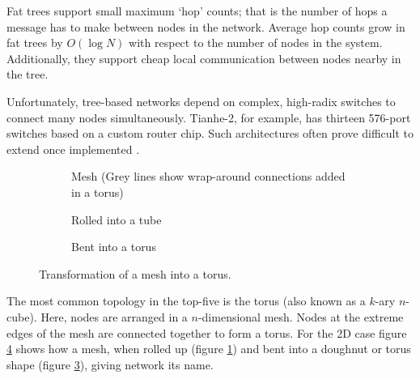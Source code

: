 				Fat trees support small maximum `hop' counts; that is the number of hops
				a message has to make between nodes in the network. Average hop counts
				grow in fat trees by $O(\log{N})$ with respect to the number of nodes in
				the system. Additionally, they support cheap local communication between
				nodes nearby in the tree.
				
				Unfortunately, tree-based networks depend on complex, high-radix
				switches to connect many nodes simultaneously.  Tianhe-2, for example,
				has thirteen 576-port switches based on a custom router chip. Such
				architectures often prove difficult to extend once implemented
				\cite{dally04}.
				
				\begin{figure}
					\begin{subfigure}[t]{\textwidth}
						\center
						
						\caption{Mesh (Grey lines show wrap-around connections added in a
						torus)}
						\label{fig:torus-flat}
					\end{subfigure}
					
					\vspace{1em}
					
					\begin{subfigure}[t]{\textwidth}
						\center
						
						\caption{Rolled into a tube}
						\label{fig:torus-pipe}
					\end{subfigure}
					
					\vspace{1em}
					
					\begin{subfigure}[t]{\textwidth}
						\center
						
						\caption{Bent into a torus}
						\label{fig:torus-3D}
					\end{subfigure}
					
					\caption{Transformation of a mesh into a torus.}
					\label{fig:forming-a-torus}
				\end{figure}
			
				The most common topology in the top-five is the torus (also known as a
				$k$-ary $n$-cube). Here, nodes are arranged in a $n$-dimensional mesh.
				Nodes at the extreme edges of the mesh are connected together to form a
				torus. For the 2D case figure \ref{fig:forming-a-torus} shows how a
				mesh, when rolled up (figure \ref{fig:torus-flat}) and bent into a
				doughnut or torus shape (figure \ref{fig:torus-3D}), giving network its
				name.
				
